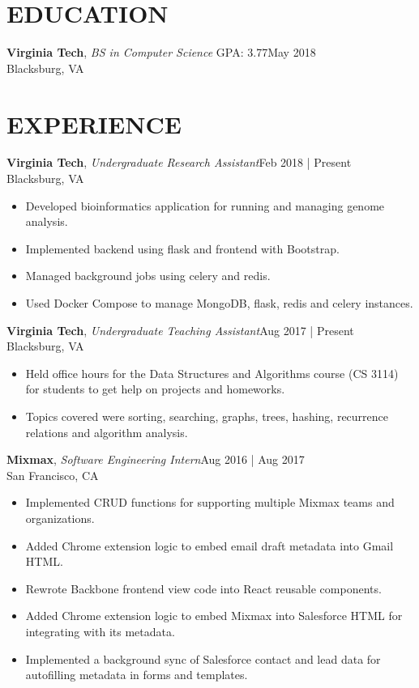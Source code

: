 \documentclass[line,margin]{res}
\begin{document}
\address{vincentl@vt.edu | (703) 992-5598 | \textbf{\href{https://github.com/vinnyoodles}{github.com/vinnyoodles}}}
\begin{resume}
	\vspace{-5mm}
	\section{EDUCATION}
		\textbf{Virginia Tech}, {\sl BS in Computer Science} GPA: 3.77\hfill May 2018\\Blacksburg, VA

	\section{EXPERIENCE}
		\textbf{Virginia Tech}, {\sl Undergraduate Research Assistant}\hfill Feb 2018 | Present\\Blacksburg, VA\\
		\begin{itemize} \itemsep 1pt
			\item Developed bioinformatics application for running and managing genome analysis.
			\item Implemented backend using flask and frontend with Bootstrap.
			\item Managed background jobs using celery and redis.
			\item Used Docker Compose to manage MongoDB, flask, redis and celery instances.
		\end{itemize}

		\textbf{Virginia Tech}, {\sl Undergraduate Teaching Assistant}\hfill Aug 2017 | Present\\Blacksburg, VA\\
		\begin{itemize} \itemsep 1pt
		\item Held office hours for the Data Structures and Algorithms course (CS 3114) for students
			  to get help on projects and homeworks.
		\item Topics covered were sorting, searching, graphs, trees, hashing, recurrence relations and algorithm analysis.
		\end{itemize}

		\textbf{Mixmax}, {\sl Software Engineering Intern}\hfill Aug 2016 | Aug 2017\\San Francisco, CA\\
		\begin{itemize} \itemsep 1pt
			\item Implemented CRUD functions for supporting multiple Mixmax teams and organizations.
			\item Added Chrome extension logic to embed email draft metadata into Gmail HTML.
			\item Rewrote Backbone frontend view code into React reusable components.
			\item Added Chrome extension logic to embed Mixmax into Salesforce HTML for integrating with its metadata.
			\item Implemented a background sync of Salesforce contact and lead data for autofilling metadata in forms and templates.
		\end{itemize}


\end{resume}
\end{document}
